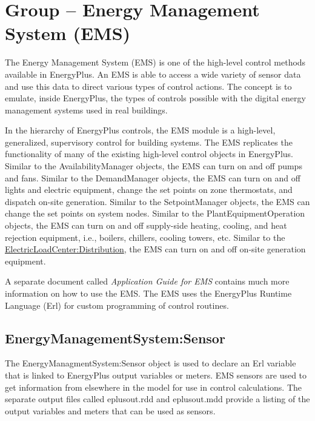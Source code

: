 \section{Group -- Energy Management System (EMS)}\label{group-energy-management-system-ems}

The Energy Management System (EMS) is one of the high-level control methods available in EnergyPlus. An EMS is able to access a wide variety of sensor data and use this data to direct various types of control actions. The concept is to emulate, inside EnergyPlus, the types of controls possible with the digital energy management systems used in real buildings.

In the hierarchy of EnergyPlus controls, the EMS module is a high-level, generalized, supervisory control for building systems. The EMS replicates the functionality of many of the existing high-level control objects in EnergyPlus. Similar to the AvailabilityManager objects, the EMS can turn on and off pumps and fans. Similar to the DemandManager objects, the EMS can turn on and off lights and electric equipment, change the set points on zone thermostats, and dispatch on-site generation. Similar to the SetpointManager objects, the EMS can change the set points on system nodes. Similar to the PlantEquipmentOperation objects, the EMS can turn on and off supply-side heating, cooling, and heat rejection equipment, i.e., boilers, chillers, cooling towers, etc. Similar to the \hyperref[electricloadcenterdistribution]{ElectricLoadCenter:Distribution}, the EMS can turn on and off on-site generation equipment.

A separate document called \emph{Application Guide for EMS} contains much more information on how to use the EMS. The EMS uses the EnergyPlus Runtime Language (Erl) for custom programming of control routines.

\subsection{EnergyManagementSystem:Sensor}\label{energymanagementsystemsensor}

The EnergyManagmentSystem:Sensor object is used to declare an Erl variable that is linked to EnergyPlus output variables or meters. EMS sensors are used to get information from elsewhere in the model for use in control calculations. The separate output files called eplusout.rdd and eplusout.mdd provide a listing of the output variables and meters that can be used as sensors.

